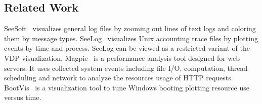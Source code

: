 \subsection{Related Work}
\label{sec:lviz-related}




SeeSoft~\cite{eick1994graphical} visualizes general log files by zooming out
lines of text logs and coloring them by message types.
SeeLog~\cite{eick1996displaying} visualizes Unix accounting trace files by
plotting events by time and process.
SeeLog can be viewed as a restricted variant of the
VDP visualization.
Magpie~\cite{barham2004using} is a performance analysis tool designed for web
servers.
It uses collected system events including file I/O, computation,
thread scheduling and network to analyze the resources usage of
HTTP requests.
BootVis~\cite{bootvis} 
is a visualization tool to tune
Windows booting plotting resource use versus time.

